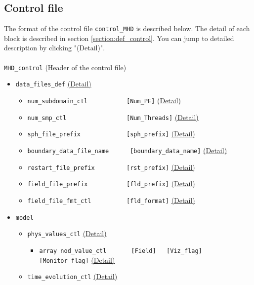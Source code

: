 \subsection{Control file}
The format of the control file \verb|control_MHD| is described below. The detail of each block is described in section \ref{section:def_control}. You can jump to detailed description by clicking "(Detail)". \\
\\
%
\verb|MHD_control|  (Header of the control file)
\label{href_i:MHD_control}
%
\begin{itemize}
\item \verb|data_files_def|
	\label{href_i:data_files_def}
	\hyperref[href_t:data_files_def]{(Detail)}
	\begin{itemize}
	\item \verb|num_subdomain_ctl           [Num_PE]|
		\hyperref[href_t:num_subdomain_ctl]{(Detail)}
	\item \verb|num_smp_ctl                 [Num_Threads]|
		\hyperref[href_t:num_smp_ctl]{(Detail)}
	\item \verb|sph_file_prefix             [sph_prefix]|
    		\hyperref[href_t:sph_file_prefix]{(Detail)}
	\item \verb|boundary_data_file_name      [boundary_data_name]|
    		\hyperref[href_t:boundary_data_file_name]{(Detail)}
%
	\item \verb|restart_file_prefix         [rst_prefix]|
    		\hyperref[href_t:restart_file_prefix]{(Detail)}
	\item \verb|field_file_prefix           [fld_prefix]|
    		\hyperref[href_t:field_file_prefix]{(Detail)}
%
	\item \verb|field_file_fmt_ctl          [fld_format]|
    		\hyperref[href_t:field_file_fmt_ctl]{(Detail)}
	\end{itemize}
%
\item \verb|model|
	\begin{itemize}
	\item \verb|phys_values_ctl|
		\label{href_i:phys_values_ctl}
    		\hyperref[href_t:phys_values_ctl]{(Detail)}
		\begin{itemize}
		\item \verb|array nod_value_ctl       [Field]   [Viz_flag] [Monitor_flag]|
	    		\hyperref[href_t:nod_value_ctl]{(Detail)}
		\end{itemize}
%
	\item \verb|time_evolution_ctl|
		\label{href_i:time_evolution_ctl}
    		\hyperref[href_t:time_evolution_ctl]{(Detail)}

\end{itemize}
\end{itemize}
